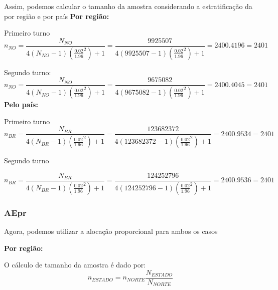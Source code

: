 \documentclass{article}
\begin{document}
Assim, podemos calcular o tamanho da amostra considerando a estratificação da por região e por país
\newpage
\textbf{Por região:}

Primeiro turno
\[
n_{NO} = \frac{N_{NO}}{4(N_{NO}-1)(\frac{0.02}{1.96}^2) + 1 } = \frac{9925507}{4(9925507 - 1) (\frac{0.02}{1.96}^2) + 1} = 2400.4196 = 2401
\]

Segundo turno:
\[
n_{NO} = \frac{N_{NO}}{4(N_{NO}-1)(\frac{0.02}{1.96}^2) + 1 } = \frac{9675082}{4(9675082 - 1) (\frac{0.02}{1.96}^2) + 1} = 2400.4045 = 2401
\]
\textbf{Pelo país:}

Primeiro turno
\[
n_{BR} = \frac{N_{BR}}{4(N_{BR}-1)(\frac{0.02}{1.96}^2) + 1 } = \frac{123682372}{4(123682372 - 1) (\frac{0.02}{1.96}^2) + 1} = 2400.9534 = 2401
\]

Segundo turno

\[
n_{BR} = \frac{N_{BR}}{4(N_{BR}-1)(\frac{0.02}{1.96}^2) + 1 } = \frac{124252796}{4(124252796 - 1) (\frac{0.02}{1.96}^2) + 1} = 2400.9536 = 2401
\]

\subsubsection*{AEpr}

Agora, podemos utilizar a alocação proporcional para ambos os casos

\textbf{Por região:}


O cálculo de tamanho da amostra é dado por:
\[
n_{ESTADO} = n_{NORTE}\frac{N_{ESTADO}}{N_{NORTE}}
\]


\begin{table}[h!]
\centering
\caption{Tamanho da Amostra Estratificada (AEpr) -- Regi\~{a}o Norte}
\end{table}

\newpage
\end{document}
